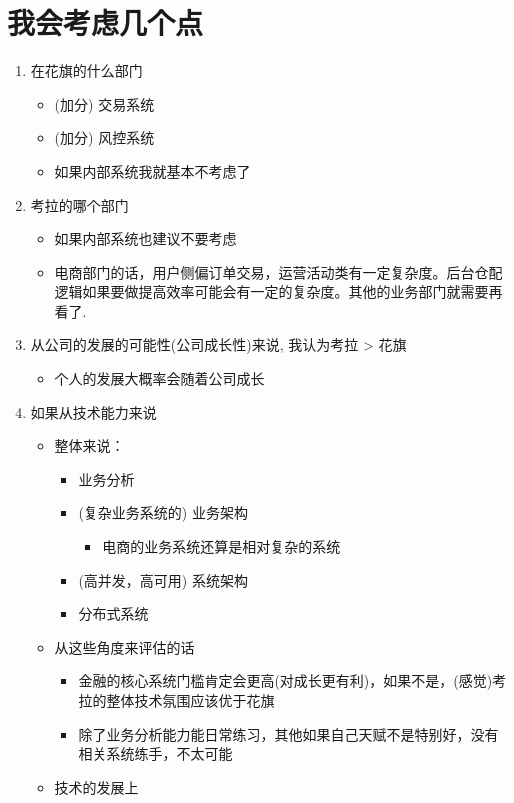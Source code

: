 \documentclass[11pt,a4paper]{article}
\author{enzo liu}
\date{\today}
\title{}
\begin{document}
\tableofcontents

\section{我会考虑几个点}
\label{sec:orgd8296c0}
\begin{enumerate}
\item 在花旗的什么部门
\begin{itemize}
\item (加分) 交易系统
\item (加分) 风控系统
\item 如果内部系统我就基本不考虑了
\end{itemize}
\item 考拉的哪个部门
\begin{itemize}
\item 如果内部系统也建议不要考虑
\item 电商部门的话，用户侧偏订单交易，运营活动类有一定复杂度。后台仓配逻辑如果要做提高效率可能会有一定的复杂度。其他的业务部门就需要再看了.
\end{itemize}
\item 从公司的发展的可能性(公司成长性)来说, 我认为考拉 > 花旗
\begin{itemize}
\item 个人的发展大概率会随着公司成长
\end{itemize}
\item 如果从技术能力来说
\begin{itemize}
\item 整体来说：
\begin{itemize}
\item 业务分析
\item (复杂业务系统的) 业务架构
\begin{itemize}
\item 电商的业务系统还算是相对复杂的系统
\end{itemize}
\item (高并发，高可用) 系统架构
\item 分布式系统
\end{itemize}
\item 从这些角度来评估的话
\begin{itemize}
\item 金融的核心系统门槛肯定会更高(对成长更有利)，如果不是，(感觉)考拉的整体技术氛围应该优于花旗
\item 除了业务分析能力能日常练习，其他如果自己天赋不是特别好，没有相关系统练手，不太可能
\end{itemize}
\item 技术的发展上

\end{itemize}
\end{enumerate}
\end{document}
